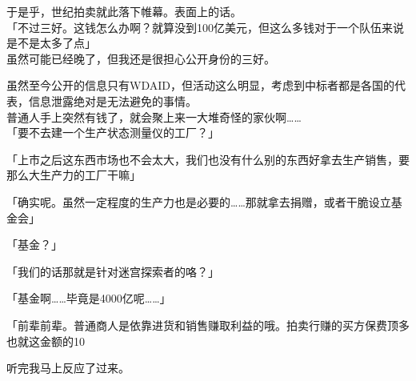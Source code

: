 于是乎，世纪拍卖就此落下帷幕。表面上的话。\\

「不过三好。这钱怎么办啊？就算没到100亿美元，但这么多钱对于一个队伍来说是不是太多了点」\\

虽然可能已经晚了，但我还是很担心公开身份的三好。

虽然至今公开的信息只有WDAID，但活动这么明显，考虑到中标者都是各国的代表，信息泄露绝对是无法避免的事情。\\

普通人手上突然有钱了，就会聚上来一大堆奇怪的家伙啊……\\

「要不去建一个生产状态测量仪的工厂？」

「上市之后这东西市场也不会太大，我们也没有什么别的东西好拿去生产销售，要那么大生产力的工厂干嘛」

「确实呢。虽然一定程度的生产力也是必要的……那就拿去捐赠，或者干脆设立基金会」

「基金？」

「我们的话那就是针对迷宫探索者的咯？」

「基金啊……毕竟是4000亿呢……」

「前辈前辈。普通商人是依靠进货和销售赚取利益的哦。拍卖行赚的买方保费顶多也就这金额的10%

听完我马上反应了过来。

